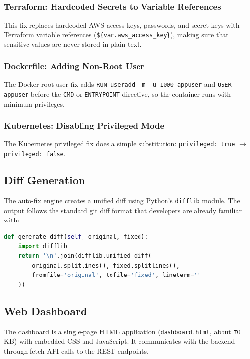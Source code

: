 \subsubsection{Terraform: Hardcoded Secrets to Variable References}

This fix replaces hardcoded AWS access keys, passwords, and secret keys with Terraform variable references (\texttt{\$\{var.aws\_access\_key\}}), making sure that sensitive values are never stored in plain text.

\subsubsection{Dockerfile: Adding Non-Root User}

The Docker root user fix adds \texttt{RUN useradd -m -u 1000 appuser} and \texttt{USER appuser} before the \texttt{CMD} or \texttt{ENTRYPOINT} directive, so the container runs with minimum privileges.

\subsubsection{Kubernetes: Disabling Privileged Mode}

The Kubernetes privileged fix does a simple substitution: \texttt{privileged: true} $\rightarrow$ \texttt{privileged: false}.

\subsection{Diff Generation}

The auto-fix engine creates a unified diff using Python's \texttt{difflib} module. The output follows the standard git diff format that developers are already familiar with:

\begin{lstlisting}[language=Python, caption={Diff generation method.}, label={lst:diff-gen}]
def generate_diff(self, original, fixed):
    import difflib
    return '\n'.join(difflib.unified_diff(
        original.splitlines(), fixed.splitlines(),
        fromfile='original', tofile='fixed', lineterm=''
    ))
\end{lstlisting}

\subsection{Web Dashboard}

The dashboard is a single-page HTML application (\texttt{dashboard.html}, about 70\,KB) with embedded CSS and JavaScript. It communicates with the backend through fetch API calls to the REST endpoints.

